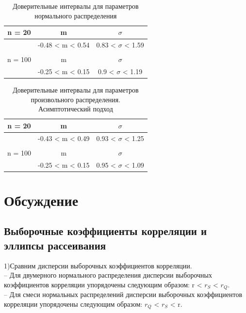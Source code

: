 \documentclass[a4]{article}
\begin{document}
		\begin{table}[h!]
			
			\caption{Доверительные интервалы для параметров нормального распределения}
			\label{tab:my_label}
			\begin{center}
				\vspace{5mm}
				
				\begin{tabular}{|c|c|c|}
					\hline
					n = 20 & m & $\sigma$\\
					\hline
					& -0.48 < m < 0.54 & 0.83 < $\sigma$ < 1.59\\ 
					\hline
					& &\\
					\hline
					n = 100 & m & $\sigma$\\
					\hline
					& -0.25 < m < 0.15 & 0.9 < $\sigma$ < 1.19\\
					\hline
				\end{tabular}
			\end{center}
		\end{table}
		
		\begin{table}[h!]
			
			\caption{Доверительные интервалы для параметров произвольного распределения. Асимптотический подход}
			\label{tab:my_label}
			\begin{center}
				\vspace{5mm}
				
				\begin{tabular}{|c|c|c|}
					\hline
					n = 20 & m & $\sigma$\\
					\hline
					& -0.43 < m < 0.49 & 0.93 < $\sigma$ < 1.25\\ 
					\hline
					& & \\
					\hline
					n = 100 & m & $\sigma$\\
					\hline
					& -0.25 < m < 0.15 & 0.95 < $\sigma$ < 1.09\\
					\hline
				\end{tabular}
			\end{center}
		\end{table}
		
		
		
	\section{Обсуждение}
		\subsection{Выборочные коэффициенты корреляции и эллипсы рассеивания}
			1)Сравним дисперсии выборочных коэффициентов корреляции.\\
			– Для двумерного нормального распределения дисперсии выборочных коэффициентов корреляции упорядочены следующим образом: r < $r_S$ < $r_Q$.\\
			– Для смеси нормальных распределений дисперсии выборочных
			коэффициентов корреляции упорядочены следующим образом:
			$r_Q$ < $r_S$ < r.\\
			
\end{document}

